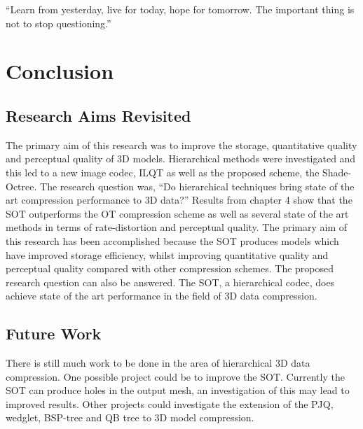 \begin{savequote}[8cm]
  ``Learn from yesterday, live for today, hope for tomorrow. The important thing is not to stop questioning.''
\end{savequote}
\makeatletter
\chapter{Conclusion}

\section{Research Aims Revisited}

The primary aim of this research was to improve the storage, quantitative quality and perceptual quality of 3D models. Hierarchical methods were investigated and this led to a new image codec, ILQT \cite{Lincoln13Interpolating} as well as the proposed scheme, the Shade-Octree. The research question was, ``Do hierarchical techniques bring state of the art compression performance to 3D data?'' Results from chapter 4 show that the SOT outperforms the OT compression scheme as well as several state of the art methods in terms of rate-distortion and perceptual quality. The primary aim of this research has been accomplished because the SOT produces models which have improved storage efficiency, whilst improving quantitative quality and perceptual quality compared with other compression schemes. The proposed research question can also be answered. The SOT, a hierarchical codec, does achieve state of the art performance in the field of 3D data compression.

\section{Future Work}

There is still much work to be done in the area of hierarchical 3D data compression. One possible project could be to improve the SOT. Currently the SOT can produce holes in the output mesh, an investigation of this may lead to improved results. Other projects could investigate the extension of the PJQ, wedglet, BSP-tree and QB tree to 3D model compression.
